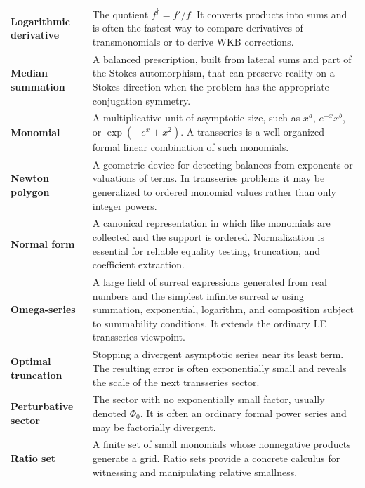 \documentclass[11pt,openany]{book}
\theoremstyle{definition}
\theoremstyle{plain}
\theoremstyle{remark}
\begin{document}
\begin{longtable}{@{}p{}p{}@{}}
\textbf{Logarithmic derivative}\index{logarithmic derivative}
& The quotient $f^\dagger=f'/f$. It converts products into sums and is often
the fastest way to compare derivatives of transmonomials or to derive WKB
corrections.\\

\textbf{Median summation}\index{median summation}
& A balanced prescription, built from lateral sums and part of the Stokes
automorphism, that can preserve reality on a Stokes direction when the
problem has the appropriate conjugation symmetry.\\

\textbf{Monomial}\index{monomial}
& A multiplicative unit of asymptotic size, such as $x^a$, $e^{-x}x^b$, or
$\exp(-e^x+x^2)$. A transseries is a well-organized formal linear combination
of such monomials.\\

\textbf{Newton polygon}\index{Newton polygon}
& A geometric device for detecting balances from exponents or valuations of
terms. In transseries problems it may be generalized to ordered monomial
values rather than only integer powers.\\

\textbf{Normal form}\index{normal form}
& A canonical representation in which like monomials are collected and the
support is ordered. Normalization is essential for reliable equality testing,
truncation, and coefficient extraction.\\

\textbf{Omega-series}\index{omega-series}
& A large field of surreal expressions generated from real numbers and the
simplest infinite surreal $\omega$ using summation, exponential, logarithm,
and composition subject to summability conditions. It extends the ordinary
LE transseries viewpoint.\\

\textbf{Optimal truncation}\index{optimal truncation}
& Stopping a divergent asymptotic series near its least term. The resulting
error is often exponentially small and reveals the scale of the next
transseries sector.\\

\textbf{Perturbative sector}\index{perturbative sector}
& The sector with no exponentially small factor, usually denoted $\Phi_0$.
It is often an ordinary formal power series and may be factorially divergent.\\

\textbf{Ratio set}\index{ratio set}
& A finite set of small monomials whose nonnegative products generate a grid.
Ratio sets provide a concrete calculus for witnessing and manipulating
relative smallness.\\


\end{longtable}
\end{document}
